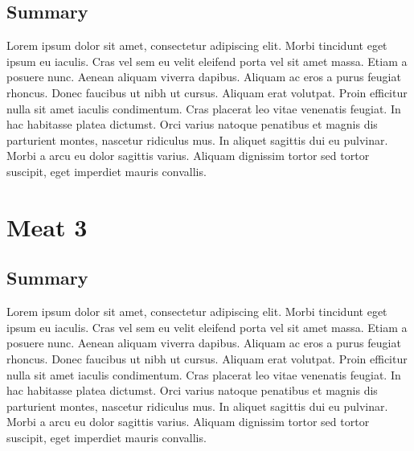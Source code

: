 \documentclass[openany]{book}
\begin{document}
\section{Summary}
Lorem ipsum dolor sit amet, consectetur adipiscing elit. Morbi tincidunt eget 
ipsum eu iaculis. Cras vel sem eu velit eleifend porta vel sit amet massa. Etiam 
a posuere nunc. Aenean aliquam viverra dapibus. Aliquam ac eros a purus feugiat 
rhoncus. Donec faucibus ut nibh ut cursus. Aliquam erat volutpat. Proin efficitur 
nulla sit amet iaculis condimentum. Cras placerat leo vitae venenatis feugiat. In 
hac habitasse platea dictumst. Orci varius natoque penatibus et magnis dis 
parturient montes, nascetur ridiculus mus. In aliquet sagittis dui eu pulvinar. 
Morbi a arcu eu dolor sagittis varius. Aliquam dignissim tortor sed tortor 
suscipit, eget imperdiet mauris convallis.



\chapter{Meat 3}
\section{Summary}
Lorem ipsum dolor sit amet, consectetur adipiscing elit. Morbi tincidunt eget 
ipsum eu iaculis. Cras vel sem eu velit eleifend porta vel sit amet massa. Etiam 
a posuere nunc. Aenean aliquam viverra dapibus. Aliquam ac eros a purus feugiat 
rhoncus. Donec faucibus ut nibh ut cursus. Aliquam erat volutpat. Proin efficitur 
nulla sit amet iaculis condimentum. Cras placerat leo vitae venenatis feugiat. In 
hac habitasse platea dictumst. Orci varius natoque penatibus et magnis dis 
parturient montes, nascetur ridiculus mus. In aliquet sagittis dui eu pulvinar. 
Morbi a arcu eu dolor sagittis varius. Aliquam dignissim tortor sed tortor 
suscipit, eget imperdiet mauris convallis.



\end{document}

